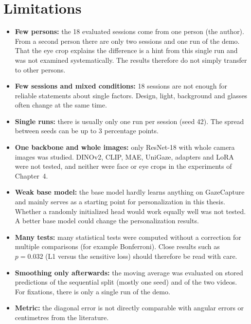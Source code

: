\section{Limitations}
\label{sec:grenzen}
\begin{itemize}
  \item \textbf{Few persons:} the 18 evaluated sessions come from one person
        (the author). From a second person there are only two sessions and one
        run of the demo. That the eye crop explains the difference is a hint
        from this single run and was not examined systematically. The results
        therefore do not simply transfer to other persons.
  \item \textbf{Few sessions and mixed conditions:} 18 sessions are not enough
        for reliable statements about single factors. Design, light, background
        and glasses often change at the same time.
  \item \textbf{Single runs:} there is usually only one run per session (seed
        42). The spread between seeds can be up to 3 percentage points.
  \item \textbf{One backbone and whole images:} only ResNet-18 with whole camera
        images was studied. DINOv2, CLIP, MAE, UniGaze, adapters and LoRA were
        not tested, and neither were face or eye crops in the experiments of
        Chapter~4.
  \item \textbf{Weak base model:} the base model hardly learns anything on
        GazeCapture and mainly serves as a starting point for personalization
        in this thesis. Whether a randomly initialized head would work equally
        well was not tested. A better base model could change the
        personalization results.
  \item \textbf{Many tests:} many statistical tests were computed without a
        correction for multiple comparisons (for example Bonferroni). Close
        results such as $p=0.032$ (L1 versus the sensitive loss) should
        therefore be read with care.
  \item \textbf{Smoothing only afterwards:} the moving average was evaluated
        on stored predictions of the sequential split (mostly one seed) and of
        the two videos. For fixations, there is only a single run of the demo.
  \item \textbf{Metric:} the diagonal error is not directly comparable with
        angular errors or centimetres from the literature.
\end{itemize}
